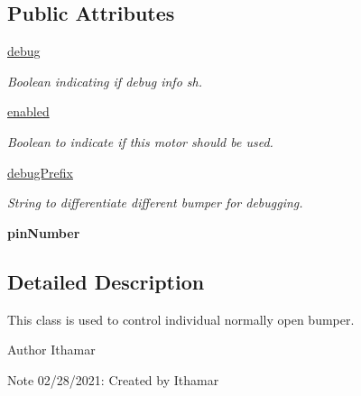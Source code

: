 \subsection*{Public Attributes}
\begin{DoxyCompactItemize}
\item 
\mbox{\label{classmcs_1_1firmware_1_1Bumper_1_1Bumper_a7929250f47ba65ba045d2f48c835b3d0}} 
\hyperlink{classmcs_1_1firmware_1_1Bumper_1_1Bumper_a7929250f47ba65ba045d2f48c835b3d0}{debug}
\begin{DoxyCompactList}\small\item\em Boolean indicating if debug info sh. \end{DoxyCompactList}\item 
\hyperlink{classmcs_1_1firmware_1_1Bumper_1_1Bumper_a7eed215dee684053cd0a8aaed6fd8a35}{enabled}
\begin{DoxyCompactList}\small\item\em Boolean to indicate if this motor should be used. \end{DoxyCompactList}\item 
\mbox{\label{classmcs_1_1firmware_1_1Bumper_1_1Bumper_ac2340114d0186cbb998026beecc09af5}} 
\hyperlink{classmcs_1_1firmware_1_1Bumper_1_1Bumper_ac2340114d0186cbb998026beecc09af5}{debug\+Prefix}
\begin{DoxyCompactList}\small\item\em String to differentiate different bumper for debugging. \end{DoxyCompactList}\item 
\mbox{\label{classmcs_1_1firmware_1_1Bumper_1_1Bumper_a78336ccc6980606412a65e929fc0182b}} 
{\bfseries pin\+Number}
\end{DoxyCompactItemize}


\subsection{Detailed Description}
This class is used to control individual normally open bumper. 

\begin{DoxyAuthor}{Author}
Ithamar 
\end{DoxyAuthor}
\begin{DoxyNote}{Note}
02/28/2021\+: Created  by Ithamar 
\end{DoxyNote}



